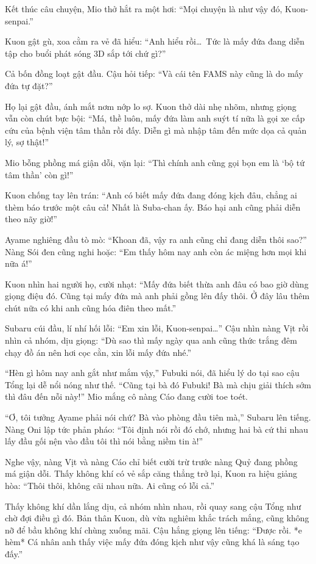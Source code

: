 \documentclass[../main.tex]{subfiles}
\begin{document}
\ct

Kết thúc câu chuyện, Mio thở hắt ra một hơi: ``Mọi chuyện là như vậy đó, Kuon-senpai.''

Kuon gật gù, xoa cằm ra vẻ đã hiểu: ``Anh hiểu rồi\dots\ Tức là mấy đứa đang diễn tập cho buổi phát sóng 3D sắp tới chứ gì?''

Cả bốn đồng loạt gật đầu. Cậu hỏi tiếp: ``Và cái tên FAMS này cũng là do mấy đứa tự đặt?''

Họ lại gật đầu, ánh mắt nơm nớp lo sợ. Kuon thở dài nhẹ nhõm, nhưng giọng vẫn còn chút bực bội: ``Má, thề luôn, mấy đứa làm anh suýt tí nữa là gọi xe cấp cứu của bệnh viện tâm thần rồi đấy. Diễn gì mà nhập tâm đến mức dọa cả quản lý, sợ thật!''

Mio bỗng phồng má giận dỗi, vặn lại: ``Thì chính anh cũng gọi bọn em là `bộ tứ tâm thần' còn gì!''

Kuon chống tay lên trán: ``Anh có biết mấy đứa đang đóng kịch đâu, chẳng ai thèm báo trước một câu cả! Nhất là Suba-chan ấy. Báo hại anh cũng phải diễn theo nãy giờ!''

Ayame nghiêng đầu tò mò: ``Khoan đã, vậy ra anh cũng chỉ đang diễn thôi sao?'' Nàng Sói đen cũng nghi hoặc: ``Em thấy hôm nay anh còn ác miệng hơn mọi khi nữa á!''

Kuon nhìn hai người họ, cười nhạt: ``Mấy đứa biết thừa anh đâu có bao giờ dùng giọng điệu đó. Cũng tại mấy đứa mà anh phải gồng lên đấy thôi. Ở đây lâu thêm chút nữa có khi anh cũng hóa điên theo mất.''

Subaru cúi đầu, lí nhí hối lỗi: ``Em xin lỗi, Kuon-senpai\dots'' Cậu nhìn nàng Vịt rồi nhìn cả nhóm, dịu giọng: ``Dù sao thì mấy ngày qua anh cũng thức trắng đêm chạy đồ án nên hơi cọc cằn, xin lỗi mấy đứa nhé.''

``Hèn gì hôm nay anh gắt như mắm vậy,'' Fubuki nói, đã hiểu lý do tại sao cậu Tổng lại dễ nổi nóng như thế. ``Cũng tại bà đó Fubuki! Bà mà chịu giải thích sớm thì đâu đến nỗi này!'' Mio mắng cô nàng Cáo đang cười toe toét.

``Ơ, tôi tưởng Ayame phải nói chứ? Bà vào phòng đầu tiên mà,'' Subaru lên tiếng. Nàng Oni lập tức phản pháo: ``Tôi định nói rồi đó chớ, nhưng hai bà cứ thi nhau lấy đầu gối nện vào đầu tôi thì nói bằng niềm tin à!''

Nghe vậy, nàng Vịt và nàng Cáo chỉ biết cười trừ trước nàng Quỷ đang phồng má giận dỗi. Thấy không khí có vẻ sắp căng thẳng trở lại, Kuon ra hiệu giảng hòa: ``Thôi thôi, không cãi nhau nữa. Ai cũng có lỗi cả.''

Thấy không khí dần lắng dịu, cả nhóm nhìn nhau, rồi quay sang cậu Tổng như chờ đợi điều gì đó. Bản thân Kuon, dù vừa nghiêm khắc trách mắng, cũng không nỡ để bầu không khí chùng xuống mãi. Cậu hắng giọng lên tiếng: ``Được rồi. *e hèm* Cá nhân anh thấy việc mấy đứa đóng kịch như vậy cũng khá là sáng tạo đấy.''
\end{document}
